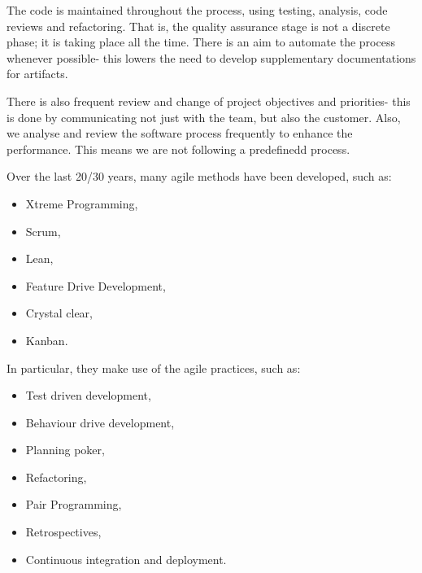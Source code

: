 \documentclass[a4paper, openany]{memoir}
\begin{document}
The code is maintained throughout the process, using testing, analysis, code reviews and refactoring. That is, the quality assurance stage is not a discrete phase; it is taking place all the time. There is an aim to automate the process whenever possible- this lowers the need to develop supplementary documentations for artifacts. 

There is also frequent review and change of project objectives and priorities- this is done by communicating not just with the team, but also the customer. Also, we analyse and review the software process frequently to enhance the performance. This means we are not following a predefinedd process.

Over the last 20/30 years, many agile methods have been developed, such as:
\begin{itemize}
    \item Xtreme Programming,
    \item Scrum,
    \item Lean,
    \item Feature Drive Development,
    \item Crystal clear,
    \item Kanban.
\end{itemize}
\noindent In particular, they make use of the agile practices, such as:
\begin{itemize}
    \item Test driven development,
    \item Behaviour drive development,
    \item Planning poker,
    \item Refactoring,
    \item Pair Programming,
    \item Retrospectives,
    \item Continuous integration and deployment.
\end{itemize}
\end{document}
